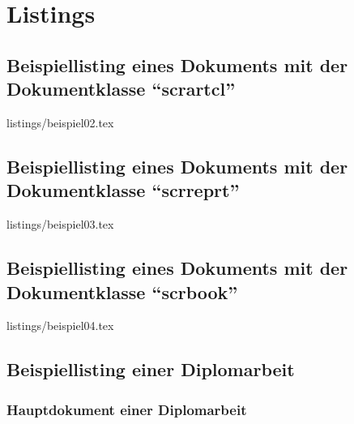 %
%

\chapter{Listings}

\section{Beispiellisting eines Dokuments mit der Dokumentklasse \enquote{scrartcl}}
\label{sec:lstarticle}

%
	{listings/beispiel02.tex}
	
\section{Beispiellisting eines Dokuments mit der Dokumentklasse \enquote{scrreprt}}
\label{sec:lstreport}

%
	{listings/beispiel03.tex}
	
\section{Beispiellisting eines Dokuments mit der Dokumentklasse \enquote{scrbook}}
\label{sec:lstbook}

%
	{listings/beispiel04.tex}

\newpage	
\section{Beispiellisting einer Diplomarbeit}
\label{sec:listing_diplomarbeit}

\subsection{Hauptdokument einer Diplomarbeit}
\label{subsec:listing_hauptdokument}

